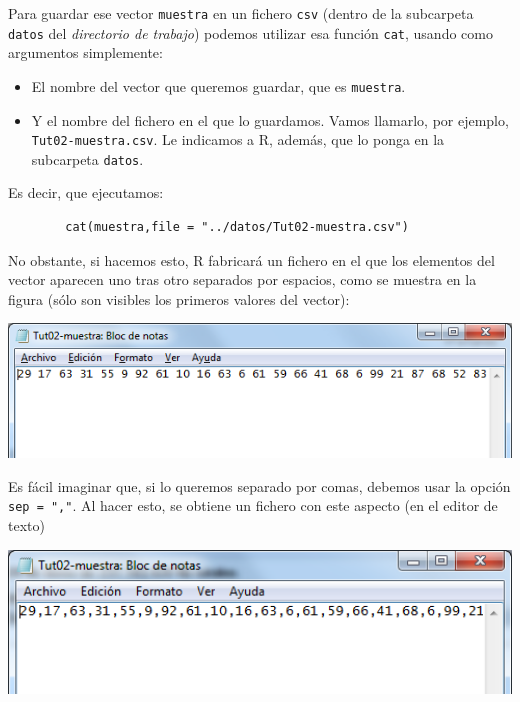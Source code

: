 \documentclass[10pt,a4paper]{article}\usepackage[]{graphicx}\usepackage[]{color}
\begin{document}
Para guardar ese vector {\tt muestra} en un fichero {\tt csv} (dentro de la subcarpeta {\tt datos} del {\em directorio de trabajo}) podemos utilizar esa función {\tt cat}, usando como argumentos simplemente:
 \begin{itemize}
   \item El nombre del vector que queremos guardar, que es {\tt muestra}.
   \item Y el nombre del fichero en el que lo guardamos. Vamos llamarlo, por ejemplo, {\tt Tut02-muestra.csv}. Le indicamos a R, además, que lo ponga en la subcarpeta {\tt datos}.
 \end{itemize}
Es decir, que ejecutamos:
\begin{verbatim}
        cat(muestra,file = "../datos/Tut02-muestra.csv")
\end{verbatim}
No obstante, si hacemos esto, R fabricará un fichero en el que los elementos del vector aparecen uno tras otro separados por espacios, como se muestra en la figura (sólo son visibles los primeros valores del vector):
    \begin{center}
    \includegraphics[width=14cm]{../fig/Tut02-12a.png}
    \end{center}
Es fácil imaginar que, si lo queremos separado por comas, debemos usar la opción \verb# sep = ","#. Al hacer esto, se obtiene un fichero con este aspecto (en el editor de texto)
    \begin{center}
    \includegraphics[width=14cm]{../fig/Tut02-13a.png}
    \end{center}
\end{document}
